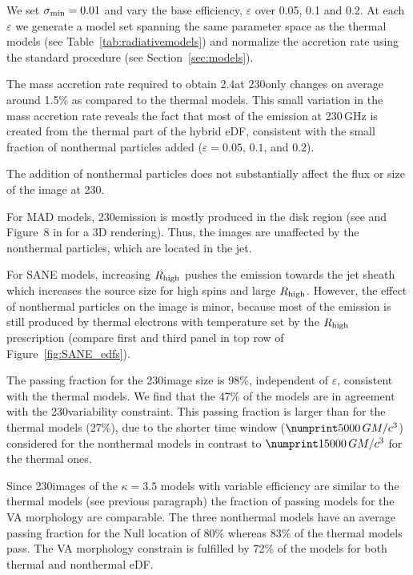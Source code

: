We set $\sigma_{\rm min}=0.01$ and vary the base efficiency, $\varepsilon$ over 0.05, 0.1 and 0.2.
At each $\varepsilon$ we generate a model set spanning the same parameter space as the thermal models (see Table~\ref{tab:radiativemodels}) and normalize the accretion rate using the standard procedure (see Section~\ref{sec:models}).

The mass accretion rate required to obtain 2.4\Jy at 230\GHz only changes on average around 1.5\% as compared to the thermal models.
This small variation in the mass accretion rate reveals the fact that most of the emission at 230\,GHz is created from the thermal part of the hybrid eDF, consistent with the small fraction of nonthermal particles added ($\varepsilon=0.05$, $0.1$, and $0.2$).

\label{varkappa230}

The addition of nonthermal particles does not substantially affect the flux or size of the image at 230\GHz.

For MAD models, 230\GHz emission is mostly produced in the disk region (see  and Figure~8 in \citealt{Wong_2022} for a 3D rendering).
Thus, the images are unaffected by the nonthermal particles, which are located in the jet.

For SANE models, increasing $R_\mathrm{high}$ pushes the emission towards the jet sheath which increases the source size for high spins and large $R_\mathrm{high}$.
However, the effect of nonthermal particles on the image is minor, because most of the emission is still produced by thermal electrons with temperature set by the $R_\mathrm{high}$ prescription (compare first and third panel in top row of Figure~\ref{fig:SANE_edfs}).

The passing fraction for the 230\GHz image size is 98\%, independent of $\varepsilon$, consistent with the thermal models.
We find that the 47\% of the models are in agreement with the 230\GHz variability constraint.
This passing fraction is larger than for the thermal models (27\%), due to the shorter time window ($\no{5000}\,\tg$) considered for the nonthermal models in contrast to $\no{15000}\,\tg$ for the thermal ones.


Since 230\GHz images of the $\kappa=3.5$ models with variable efficiency are similar to the thermal models (see previous paragraph) the fraction of passing models for the VA morphology are comparable.
The three nonthermal models have an average passing fraction for the Null location of 80\% whereas 83\% of the thermal models pass.
The VA morphology constrain is fulfilled by 72\% of the models for both thermal and nonthermal eDF.

